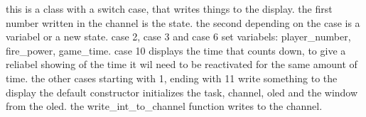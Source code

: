 this is a class with a switch case, that writes things to the display. the first number written in the channel is the state. the second depending on the case is a variabel or a new state. case 2, case 3 and case 6 set variabels\+: player\+\_\+number, fire\+\_\+power, game\+\_\+time. case 10 displays the time that counts down, to give a reliabel showing of the time it wil need to be reactivated for the same amount of time. the other cases starting with 1, ending with 11 write something to the display the default constructor initializes the task, channel, oled and the window from the oled. the write\+\_\+int\+\_\+to\+\_\+channel function writes to the channel. 